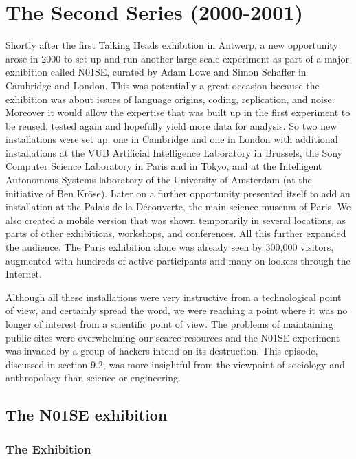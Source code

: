 \chapter{The Second Series (2000-2001)}
\label{c:n01se}

Shortly after the first Talking Heads exhibition in Antwerp, a new opportunity arose in 2000 to set up and run another
large-scale experiment as part of a major exhibition called N01SE, curated by Adam Lowe and Simon Schaffer in Cambridge
and London. This was potentially 
a great occasion because the exhibition was about issues of language origins, coding, replication, 
and noise. Moreover it would allow the expertise that was built up in the first experiment to be reused, 
tested again and hopefully yield more data for analysis. So two new installations were set up: one in 
Cambridge and one in London with additional installations at the VUB Artificial Intelligence 
Laboratory in Brussels, the Sony Computer Science Laboratory in Paris and in Tokyo, and at the 
Intelligent Autonomous Systems laboratory of the University of Amsterdam (at the initiative of Ben Kr\"{o}se). 
Later on a further opportunity presented itself to add an installation at the 
Palais de la D\'{e}couverte, the main science museum of Paris. 
We also created a mobile version that was shown temporarily in several locations, as parts of 
other exhibitions, workshops, and conferences.  All this further expanded the 
audience. The Paris exhibition alone was already seen 
by 300,000 visitors, augmented with hundreds of active participants and many on-lookers through the Internet. 

Although all these installations were very instructive from a technological point of view, and certainly spread 
the word, we were reaching a point where it was no longer of interest from a scientific point of view. The problems 
of maintaining public sites were overwhelming our scarce resources
and the N01SE experiment was invaded by a group of hackers intend 
on its destruction. This episode, discussed in section 9.2, was more insightful from the viewpoint of sociology 
and anthropology than science or engineering. 

\section{The N01SE exhibition} 

\subsection{The Exhibition} 

